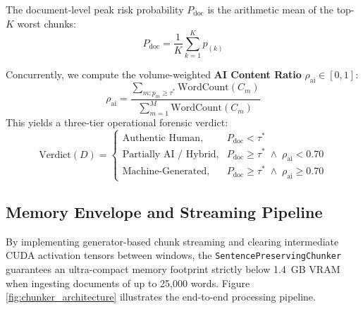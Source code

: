 The document-level peak risk probability $P_{\text{doc}}$ is the arithmetic mean of the top-$K$ worst chunks:
\begin{equation}
    \label{eq:p_doc}
    P_{\text{doc}} = \frac{1}{K} \sum_{k=1}^K p_{(k)}
\end{equation}

Concurrently, we compute the volume-weighted \textbf{AI Content Ratio} $\rho_{\text{ai}} \in [0, 1]$:
\begin{equation}
    \label{eq:ai_content_ratio}
    \rho_{\text{ai}} = \frac{\sum_{m: p_m \ge \tau^*} \text{WordCount}(C_m)}{\sum_{m=1}^M \text{WordCount}(C_m)}
\end{equation}
This yields a three-tier operational forensic verdict:
\begin{equation}
    \label{eq:verdict_tiers}
    \text{Verdict}(D) = \begin{cases}
        \text{Authentic Human}, & P_{\text{doc}} < \tau^* \\
        \text{Partially AI / Hybrid}, & P_{\text{doc}} \ge \tau^* \;\wedge\; \rho_{\text{ai}} < 0.70 \\
        \text{Machine-Generated}, & P_{\text{doc}} \ge \tau^* \;\wedge\; \rho_{\text{ai}} \ge 0.70
    \end{cases}
\end{equation}

\subsection{Memory Envelope and Streaming Pipeline}
By implementing generator-based chunk streaming and clearing intermediate CUDA activation tensors between windows, the \texttt{SentencePreservingChunker} guarantees an ultra-compact memory footprint strictly below 1.4~GB VRAM when ingesting documents of up to 25,000 words. Figure \ref{fig:chunker_architecture} illustrates the end-to-end processing pipeline.

